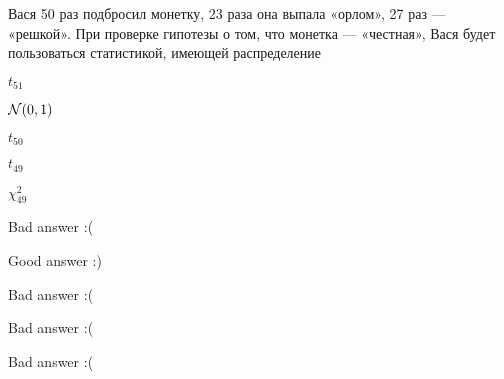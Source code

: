 
\begin{question}
Вася 50 раз подбросил монетку, 23 раза она выпала «орлом», 27 раз ---
«решкой». При проверке гипотезы о том, что монетка --- «честная», Вася
будет пользоваться статистикой, имеющей распределение
\begin{answerlist}
  \item \(t_{51}\)
  \item \(\mathcal{N}(0,1)\)
  \item \(t_{50}\)
  \item \(t_{49}\)
  \item \(\chi^2_{49}\)
\end{answerlist}
\end{question}

\begin{solution}
\begin{answerlist}
  \item Bad answer :(
  \item Good answer :)
  \item Bad answer :(
  \item Bad answer :(
  \item Bad answer :(
\end{answerlist}
\end{solution}


